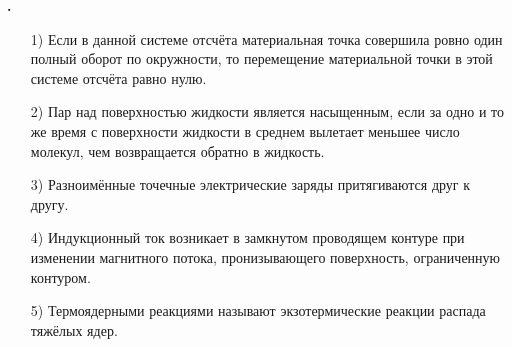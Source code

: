 \documentclass[12pt,a4paper]{article}
\newif\ifShowSolutions
\newcounter{banktask}
\newcommand{\BankTask}[3]{%
  \refstepcounter{banktask}%
  \Needspace{35mm}\par\medskip\noindent\begin{minipage}{\linewidth}%
  \noindent\textbf{\thebanktask.}\quad #2\par
  \ifShowSolutions
    #3\par
    \ifdefined\TutorEdition
      \ifcsname TutorSource#1\endcsname
        \smallskip{\small\csname TutorSource#1\endcsname\par}%
      \fi
    \fi
  \fi
  \end{minipage}\par\medskip
}
\begin{document}
\BankTask{9E0663}{
\begin{enumerate}
\item[1)] Если в данной системе отсчёта материальная точка совершила ровно один полный оборот по окружности, то перемещение материальной точки в этой системе отсчёта равно нулю.
\item[2)] Пар над поверхностью жидкости является насыщенным, если за одно и то же время с поверхности жидкости в среднем вылетает меньшее число молекул, чем возвращается обратно в жидкость.
\item[3)] Разноимённые точечные электрические заряды притягиваются друг к другу.
\item[4)] Индукционный ток возникает в замкнутом проводящем контуре при изменении магнитного потока, пронизывающего поверхность, ограниченную контуром.
\item[5)] Термоядерными реакциями называют экзотермические реакции распада тяжёлых ядер.
\end{enumerate}
}{
\smallskip\noindent\textbf{Решение от GPT}\par
1) Верно: после полного оборота конечное положение совпадает с начальным, поэтому \(\Delta\vec r=0\). 2) Неверно: насыщенный пар находится в динамическом равновесии с жидкостью, и средние числа вылетевших и вернувшихся молекул за одинаковое время равны. 3) Верно: разноимённые заряды притягиваются по закону Кулона. 4) Верно: по закону электромагнитной индукции \(\mathcal{E}_i=-\frac{d\Phi}{dt}\), и в замкнутом проводящем контуре возникает ток. 5) Неверно: термоядерные реакции представляют собой слияние лёгких ядер при высоких температурах. Ответ: \(134\).
}
\end{document}

